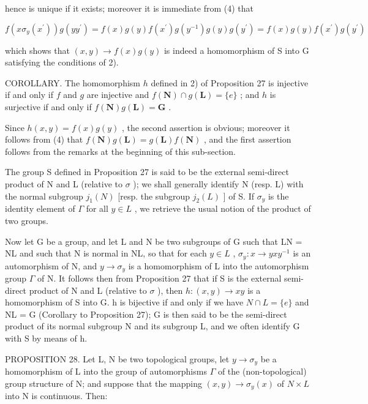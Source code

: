 hence is unique if it exists; moreover it is immediate from (4) that

\[
f \left(x \sigma_ {y} (x ^ {\prime})\right) g (y y ^ {\prime}) = f (x) g (y) f (x ^ {\prime}) g (y ^ {- 1}) g (y) g (y ^ {\prime}) = f (x) g (y) f (x ^ {\prime}) g (y ^ {\prime})
\]

which shows that \((x, y) \to f(x)g(y)\) is indeed a homomorphism of S into G satisfying the conditions of 2).

COROLLARY. The homomorphism \(h\) defined in 2) of Proposition 27 is injective if and only if \(f\) and \(g\) are injective and \(f(\mathbf{N}) \cap g(\mathbf{L}) = \{e\}\) ; and \(h\) is surjective if and only if \(f(\mathbf{N})g(\mathbf{L}) = \mathbf{G}\) .

Since \(h(x, y) = f(x)g(y)\) , the second assertion is obvious; moreover it follows from (4) that \(f(\mathbf{N})g(\mathbf{L}) = g(\mathbf{L})f(\mathbf{N})\) , and the first assertion follows from the remarks at the beginning of this sub-section.

The group S defined in Proposition 27 is said to be the external semi-direct product of N and L (relative to \(\sigma\) ); we shall generally identify N (resp. L) with the normal subgroup \(j_{1}(N)\) {[}resp. the subgroup \(j_{2}(L)\) {]} of S. If \(\sigma_{y}\) is the identity element of \(\Gamma\) for all \(y \in L\) , we retrieve the usual notion of the product of two groups.

Now let G be a group, and let L and N be two subgroups of G such that LN = NL and such that N is normal in NL, so that for each \(y \in L\) , \(\sigma_{y} : x \to yxy^{-1}\) is an automorphism of N, and \(y \to \sigma_{y}\) is a homomorphism of L into the automorphism group \(\Gamma\) of N. It follows then from Proposition 27 that if S is the external semi-direct product of N and L (relative to \(\sigma\) ), then \(h : (x, y) \to xy\) is a homomorphism of S into G. h is bijective if and only if we have \(N \cap L = \{e\}\) and NL = G (Corollary to Proposition 27); G is then said to be the semi-direct product of its normal subgroup N and its subgroup L, and we often identify G with S by means of h.

PROPOSITION 28. Let L, N be two topological groups, let \(y \to \sigma_y\) be a homomorphism of L into the group of automorphisms \(\Gamma\) of the (non-topological) group structure of N; and suppose that the mapping \((x, y) \to \sigma_y(x)\) of \(N \times L\) into N is continuous. Then:

